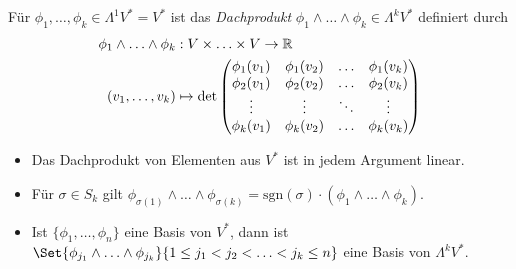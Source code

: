 \documentclass{cheat-sheet}
\theoremstyle{definition}
\begin{document}
\iffalse
\begin{nota}
  $\Lambda V^* \coloneqq \oplus_{k=1}^n \Lambda^k V^*$
\end{nota}
\fi

\begin{defn}
  Für $\phi_1, \ldots, \phi_k \in \Lambda^1 V^* = V^*$ ist das \emph{Dachprodukt} $\phi_1 \wedge \ldots \wedge \phi_k \in \Lambda^k V^*$ definiert durch
  \begin{align*}
    \phi_1 \wedge \ldots \wedge \phi_k &: V \times \ldots \times V \to \mathbb{R} \\
    (v_1, \ldots, v_k) &\mapsto \det \begin{pmatrix}
      \phi_1(v_1) & \phi_1(v_2) & \ldots & \phi_1(v_k) \\
      \phi_2(v_1) & \phi_2(v_2) & \ldots & \phi_2(v_k) \\
      \vdots & \vdots & \ddots & \vdots \\
      \phi_k(v_1) & \phi_k(v_2) & \ldots & \phi_k(v_k)
    \end{pmatrix}
  \end{align*}
\end{defn}

\begin{eign}
  \begin{itemize}
    \item Das Dachprodukt von Elementen aus $V^*$ ist in jedem Argument linear.
    \item Für $\sigma \in S_k$ gilt $\phi_{\sigma(1)} \wedge \ldots \wedge \phi_{\sigma(k)} = \mathrm{sgn}(\sigma) \cdot (\phi_1 \wedge \ldots \wedge \phi_k)$.
  \end{itemize}
\end{eign}

\begin{prop}
  \begin{itemize}
    \item Ist $\{ \phi_1, \ldots, \phi_n \}$ eine Basis von $V^*$, dann ist $\Set{ \phi_{j_1} \wedge \ldots \wedge \phi_{j_k} }{ 1 \leq j_1 < j_2 < \ldots < j_k \leq n }$ eine Basis von $\Lambda^k V^*$.

    \vspace{4pt}

  \end{itemize}
\end{prop}
\end{document}
